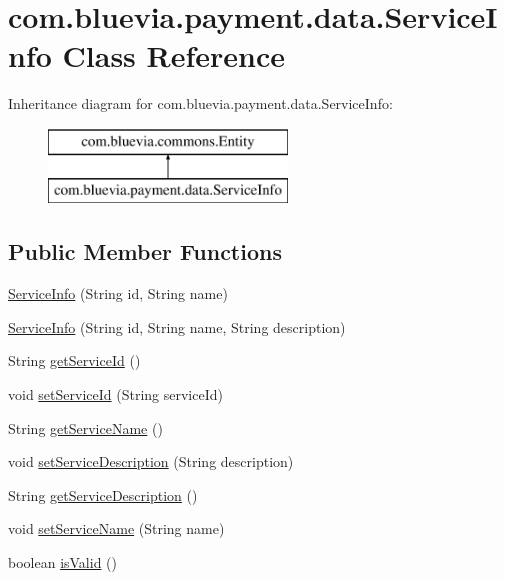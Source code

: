 \hypertarget{classcom_1_1bluevia_1_1payment_1_1data_1_1ServiceInfo}{
\section{com.bluevia.payment.data.ServiceInfo Class Reference}
\label{classcom_1_1bluevia_1_1payment_1_1data_1_1ServiceInfo}
}
Inheritance diagram for com.bluevia.payment.data.ServiceInfo:\begin{figure}[H]
\begin{center}
\leavevmode
\includegraphics[height=2.000000cm]{classcom_1_1bluevia_1_1payment_1_1data_1_1ServiceInfo}
\end{center}
\end{figure}
\subsection*{Public Member Functions}
\begin{DoxyCompactItemize}
\item 
\hyperlink{classcom_1_1bluevia_1_1payment_1_1data_1_1ServiceInfo_a432f1a0b28200d0ab6a95167ef212ae9}{ServiceInfo} (String id, String name)
\item 
\hyperlink{classcom_1_1bluevia_1_1payment_1_1data_1_1ServiceInfo_a0601dc14ba4cc81f11ff0b5e4e85c82c}{ServiceInfo} (String id, String name, String description)
\item 
String \hyperlink{classcom_1_1bluevia_1_1payment_1_1data_1_1ServiceInfo_a96c0f823821cc02c1581838feefc00f4}{getServiceId} ()
\item 
void \hyperlink{classcom_1_1bluevia_1_1payment_1_1data_1_1ServiceInfo_a8222beb66cec38f1edbf6a460098add8}{setServiceId} (String serviceId)
\item 
String \hyperlink{classcom_1_1bluevia_1_1payment_1_1data_1_1ServiceInfo_a1b035b0c1916abee43ad292e4b2a6fda}{getServiceName} ()
\item 
void \hyperlink{classcom_1_1bluevia_1_1payment_1_1data_1_1ServiceInfo_ab91a03285c12258625bcb718de3ff5ce}{setServiceDescription} (String description)
\item 
String \hyperlink{classcom_1_1bluevia_1_1payment_1_1data_1_1ServiceInfo_a4a4ab2b39ecba66562da18b27f20ae82}{getServiceDescription} ()
\item 
void \hyperlink{classcom_1_1bluevia_1_1payment_1_1data_1_1ServiceInfo_a208f9bac325eb0203e17a9286e62bb5a}{setServiceName} (String name)
\item 
boolean \hyperlink{classcom_1_1bluevia_1_1payment_1_1data_1_1ServiceInfo_aba6bbc18f24d96576fde15309337f1e8}{isValid} ()
\end{DoxyCompactItemize}


